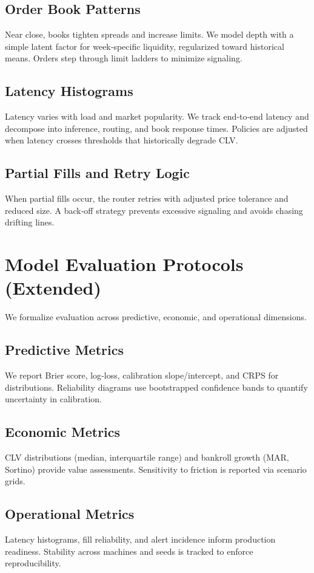 \documentclass[12pt]{report}  %
\numberwithin{equation}{section}
\theoremstyle{plain}
\theoremstyle{definition}
\theoremstyle{remark}
\begin{document}
\section{Order Book Patterns}
Near close, books tighten spreads and increase limits. We model depth with a simple latent factor for week‑specific liquidity, regularized toward historical means. Orders step through limit ladders to minimize signaling.

\section{Latency Histograms}
Latency varies with load and market popularity. We track end‑to‑end latency and decompose into inference, routing, and book response times. Policies are adjusted when latency crosses thresholds that historically degrade CLV.

\section{Partial Fills and Retry Logic}
When partial fills occur, the router retries with adjusted price tolerance and reduced size. A back‑off strategy prevents excessive signaling and avoids chasing drifting lines.

\chapter{Model Evaluation Protocols (Extended)}
We formalize evaluation across predictive, economic, and operational dimensions.

\section{Predictive Metrics}
We report Brier score, log‑loss, calibration slope/intercept, and CRPS for distributions. Reliability diagrams use bootstrapped confidence bands to quantify uncertainty in calibration.

\section{Economic Metrics}
CLV distributions (median, interquartile range) and bankroll growth (MAR, Sortino) provide value assessments. Sensitivity to friction is reported via scenario grids.

\section{Operational Metrics}
Latency histograms, fill reliability, and alert incidence inform production readiness. Stability across machines and seeds is tracked to enforce reproducibility.
\end{document}
